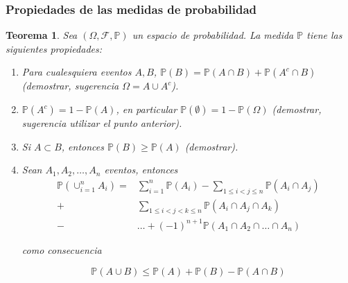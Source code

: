 \documentclass[11pt]{report}
\theoremstyle{break}
\newtheorem{teorema}{Teorema}[chapter]
\theoremstyle{break}
\begin{document}
\subsubsection{Propiedades de las medidas de probabilidad}

\begin{teorema}
\label{teorema:propiedades de las medidas de probabilidad}
Sea $\left( \Omega, \mathcal{F}, \mathbb{P} \right)$ un espacio de probabilidad. La medida $\mathbb{P}$ tiene las siguientes propiedades:

\begin{enumerate}
\item Para cualesquiera eventos $A,B$, $\mathbb{P}(B) = \mathbb{P}(A \cap B) + \mathbb{P}(A^c \cap B)$ (demostrar, sugerencia $\Omega = A \cup A^c$).

\item $\mathbb{P}(A^c) = 1 - \mathbb{P}(A)$, en particular $\mathbb{P}(\emptyset) = 1 - \mathbb{P}(\Omega)$ (demostrar, sugerencia utilizar el punto anterior).

\item Si $A \subset B$, entonces $\mathbb{P}(B) \geq \mathbb{P}(A)$ (demostrar).

\item Sean $A_1, A_2, \ldots, A_n$  eventos, entonces 
\begin{align*}
\mathbb{P}(\cup_{i=1}^{n}A_i)  = & \sum_{i=1}^{n}\mathbb{P}(A_i) - \sum_{1 \leq i < j \leq n} \mathbb{P}(A_i \cap A_j) \\
+ & \sum_{1 \leq i < j < k \leq n} \mathbb{P}(A_i \cap A_j \cap A_k) \\
- & \ldots + (-1)^{n + 1}\mathbb{P}(A_1 \cap A_2 \cap \ldots \cap A_n)
\end{align*}

como consecuencia

$$
\mathbb{P}(A \cup B) \leq \mathbb{P}(A) + \mathbb{P}(B) - \mathbb{P}(A \cap B)
$$

\end{enumerate}

\end{teorema}
\end{document}
